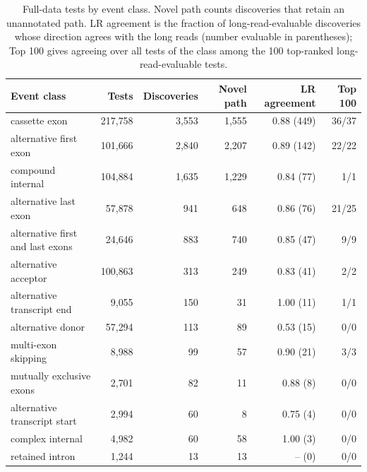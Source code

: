 \documentclass[11pt]{article}
\begin{document}
\begin{table}[ht]
\centering
\footnotesize
\setlength{\tabcolsep}{4pt}
\begin{tabular}{lrrrrr}
\toprule
Event class & Tests & Discoveries & Novel path & LR agreement & Top 100\\
\midrule
cassette exon & 217{,}758 & 3{,}553 & 1{,}555 & 0.88 (449) & 36/37\\
alternative first exon & 101{,}666 & 2{,}840 & 2{,}207 & 0.89 (142) & 22/22\\
compound internal & 104{,}884 & 1{,}635 & 1{,}229 & 0.84 (77) & 1/1\\
alternative last exon & 57{,}878 & 941 & 648 & 0.86 (76) & 21/25\\
alternative first and last exons & 24{,}646 & 883 & 740 & 0.85 (47) & 9/9\\
alternative acceptor & 100{,}863 & 313 & 249 & 0.83 (41) & 2/2\\
alternative transcript end & 9{,}055 & 150 & 31 & 1.00 (11) & 1/1\\
alternative donor & 57{,}294 & 113 & 89 & 0.53 (15) & 0/0\\
multi-exon skipping & 8{,}988 & 99 & 57 & 0.90 (21) & 3/3\\
mutually exclusive exons & 2{,}701 & 82 & 11 & 0.88 (8) & 0/0\\
alternative transcript start & 2{,}994 & 60 & 8 & 0.75 (4) & 0/0\\
complex internal & 4{,}982 & 60 & 58 & 1.00 (3) & 0/0\\
retained intron & 1{,}244 & 13 & 13 & -- (0) & 0/0\\
\bottomrule
\end{tabular}
\caption{Full-data tests by event class. Novel path counts discoveries that retain an unannotated path. LR agreement is the fraction of long-read-evaluable discoveries whose direction agrees with the long reads (number evaluable in parentheses); Top 100 gives agreeing over all tests of the class among the 100 top-ranked long-read-evaluable tests.}
\label{tab:events}
\end{table}
\end{document}
